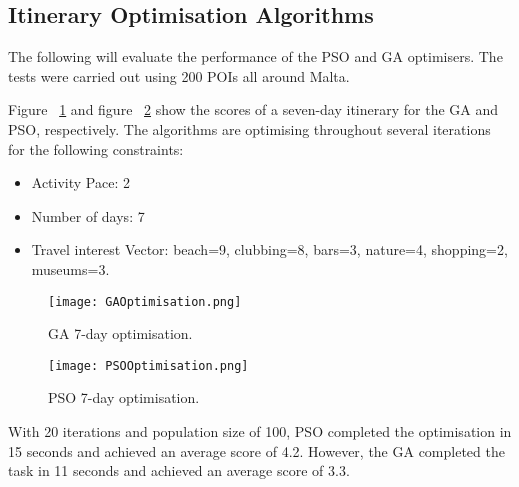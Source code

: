 \subsection{Itinerary Optimisation Algorithms}

The following will evaluate the performance of the PSO
and GA optimisers. The tests were carried out using
200 POIs all around Malta.

Figure ~\ref{GAOptimisation} and figure ~\ref{PSOoptimise} show the scores of a seven-day
itinerary for the GA and PSO, respectively. The
algorithms are optimising throughout several
iterations for the following constraints:

\begin{itemize}
    \item Activity Pace: 2
    \item Number of days: 7
    \item Travel interest Vector:  beach=9, clubbing=8, bars=3, nature=4, shopping=2, museums=3.
\end{itemize}

\begin{figure}[h]
\centering
        \texttt{[image: GAOptimisation.png]}
        \caption{GA 7-day optimisation.}
        \label{GAOptimisation}
\end{figure}

\begin{figure}[h]
\centering
        \texttt{[image: PSOOptimisation.png]} 
        \caption{PSO 7-day optimisation.}
        \label{PSOoptimise}
\end{figure}




With 20 iterations and population size of 100, PSO
completed the optimisation in 15 seconds and achieved
an average score of 4.2. However, the GA completed the
task in 11 seconds and achieved an average score of
3.3.

